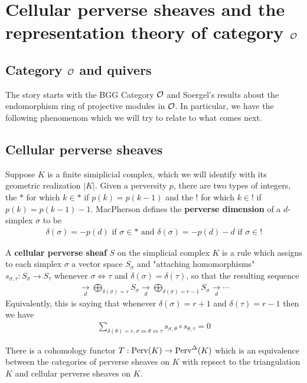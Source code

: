 \documentclass[12pt]{article}
\begin{document}
\section{Cellular perverse sheaves and the representation theory of category ${\mathcal{O}}$}
\subsection{Category ${\mathcal{O}}$ and quivers}
The story starts with the BGG Category ${\mathcal{O}}$ and Soergel's results about the 
endomorphism ring of projective modules in ${\mathcal{O}}$. In particular, we have the following 
phenomenom which we will try to relate to what comes next.
\subsection{Cellular perverse sheaves}
Suppose $K$ is a finite simiplicial complex, which we will 
identify with its geometric realization $|K|$. Given a perversity $p$, 
there are two types of integers, the $*$ for which $k\in *$ if $p(k) = p(k-1)$ and 
the $!$ for which $k\in !$ if $p(k) = p(k-1) -1$. MacPherson defines the \textbf{
perverse dimension
} of a $d$-simplex $\sigma$ to be \begin{align*}
    \delta(\sigma) = -p(d) \text{ if } \sigma \in * \text{ and } \delta(\sigma) = -p(d)-d \text{ if } \sigma \in !
\end{align*}

\begin{definition}
    A \textbf{cellular perverse sheaf} $S$ on the simplicial complex $K$ is a 
    rule which assigns to each simplex $\sigma$ a vector space $S_{\sigma}$ and
    "attaching homomorphisms" $s_{\sigma,\tau}:S_{\sigma} \to S_{\tau}$ whenever $\sigma \iff \tau$
    and $\delta(\sigma) = \delta(\tau)$, so that the resulting sequence \begin{align*}
        \xrightarrow[d]{} \bigoplus_{\delta(\sigma) = r} S_{\sigma} \xrightarrow[d]{} \bigoplus_{\delta(\sigma) = r-1} S_{\sigma} \xrightarrow[d]{} \cdots
    \end{align*} Equivalently, this is saying that whenever $\delta(\sigma) = r +1$ and $\delta(\tau) = r-1$ then 
    we have \begin{align*}
        \sum_{\delta(\theta) = r, \sigma \iff \theta \iff \tau} s_{\sigma,\theta} \circ s_{\theta,\tau} = 0
    \end{align*}
\end{definition}
There is a cohomology functor $T:\operatorname{Perv}(K) \to \operatorname{Perv}^{\Delta}(K)$ which is an equivalence 
between the categories of perverse sheaves on $K$ with repsect to the triangulation $K$
and cellular perverse sheaves on $K$.
\end{document}
